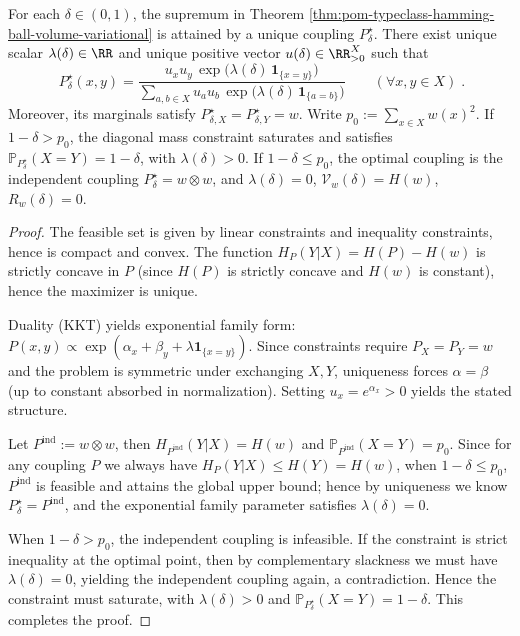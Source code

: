 \begin{theorem}\label{thm:pom-typeclass-hamming-ball-unique-maximizer-exponential-family}
For each \(\delta\in(0,1)\), the supremum in Theorem \ref{thm:pom-typeclass-hamming-ball-volume-variational} is attained by a unique coupling \(P^\star_\delta\).
There exist unique scalar \(\lambda(\delta)\in\RR\) and unique positive vector \(u(\delta)\in\RR_{>0}^{X}\) such that
\[
\boxed{\;
P^\star_\delta(x,y)
=
\frac{u_xu_y\,\exp\!\bigl(\lambda(\delta)\,\mathbf 1_{\{x=y\}}\bigr)}
{\sum_{a,b\in X}u_au_b\,\exp\!\bigl(\lambda(\delta)\,\mathbf 1_{\{a=b\}}\bigr)}\qquad(\forall x,y\in X)\; }.
\]
Moreover, its marginals satisfy \(P^\star_{\delta,X}=P^\star_{\delta,Y}=w\).
Write \(p_0:=\sum_{x\in X}w(x)^2\).
If \(1-\delta>p_0\), the diagonal mass constraint saturates and satisfies \(\mathbb P_{P^\star_\delta}(X=Y)=1-\delta\), with \(\lambda(\delta)>0\).
If \(1-\delta\le p_0\), the optimal coupling is the independent coupling \(P^\star_\delta=w\otimes w\), and \(\lambda(\delta)=0\), \(\mathcal V_w(\delta)=H(w)\), \(R_w(\delta)=0\).
\end{theorem}
\begin{proof}
The feasible set is given by linear constraints and inequality constraints, hence is compact and convex.
The function \(H_P(Y|X)=H(P)-H(w)\) is strictly concave in \(P\) (since \(H(P)\) is strictly concave and \(H(w)\) is constant),
hence the maximizer is unique.
\par
Duality (KKT) yields exponential family form:
\(
P(x,y)\propto \exp(\alpha_x+\beta_y+\lambda\mathbf 1_{\{x=y\}})
\).
Since constraints require \(P_X=P_Y=w\) and the problem is symmetric under exchanging \(X,Y\), uniqueness forces \(\alpha=\beta\) (up to constant absorbed in normalization).
Setting \(u_x=e^{\alpha_x}>0\) yields the stated structure.
\par
Let \(P^{\mathrm{ind}}:=w\otimes w\), then \(H_{P^{\mathrm{ind}}}(Y|X)=H(w)\) and \(\mathbb P_{P^{\mathrm{ind}}}(X=Y)=p_0\).
Since for any coupling \(P\) we always have \(H_P(Y|X)\le H(Y)=H(w)\), when \(1-\delta\le p_0\), \(P^{\mathrm{ind}}\) is feasible and attains the global upper bound;
hence by uniqueness we know \(P^\star_\delta=P^{\mathrm{ind}}\), and the exponential family parameter satisfies \(\lambda(\delta)=0\).
\par
When \(1-\delta>p_0\), the independent coupling is infeasible.
If the constraint is strict inequality at the optimal point, then by complementary slackness we must have \(\lambda(\delta)=0\), yielding the independent coupling again, a contradiction.
Hence the constraint must saturate, with \(\lambda(\delta)>0\) and \(\mathbb P_{P^\star_\delta}(X=Y)=1-\delta\). This completes the proof.
\end{proof}

